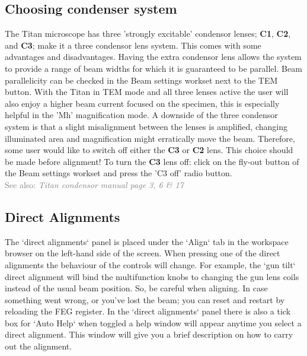 \documentclass[a4paper]{scrartcl}
\begin{document}
\subsection*{Choosing condenser system}
The Titan microscope has three 'strongly excitable' condensor lenses; \textbf{C1}, \textbf{C2}, and \textbf{C3}; make it a three condensor lens system. This comes with some advantages and disadvantages. Having the extra condensor lens allows the system to provide a range of beam widths for which it is guaranteed to be parallel. Beam parallelicity can be checked in the Beam settings workset next to the TEM button. With the Titan in TEM mode and all three lenses active the user will also enjoy a higher beam current focused on the specimen, this is especially helpful in the 'Mh' magnification mode. A downside of the three condensor system is that a slight misalignment between the lenses is amplified, changing illuminated area and magnification might erratically move the beam. Therefore, some user would like to switch off either the \textbf{C3} or \textbf{C2} lens. This choice should be made before alignment! To turn the \textbf{C3} lens off: click on the fly-out button of the Beam settings workset and press the 'C3 off' radio button.\\
\textcolor{gray}{See also: \textit{Titan condensor manual page 3, 6 \& 17}}


\subsection*{Direct Alignments}
The `direct alignments` panel is placed under the `Align` tab in the workspace browser on the left-hand side of the screen. When pressing one of the direct alignments the behaviour of the controls will change. For example, the `gun tilt` direct alignment will bind the multifunction knobs to changing the gun lens coils instead of the usual beam position. So, be careful when aligning. In case something went wrong, or you've lost the beam; you can reset and restart by reloading the FEG register. In the `direct alignments` panel there is also a tick box for `Auto Help` when toggled a help window will appear anytime you select a direct alignment. This window will give you a brief description on how to carry out the alignment.
\end{document}
